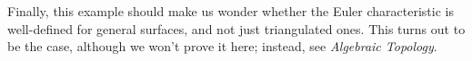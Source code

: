 Finally, this example should make us wonder whether the Euler characteristic is well-defined for general surfaces, and not just triangulated ones. This turns out to be the case, although we won't prove it here; instead, see \emph{Algebraic Topology}.





